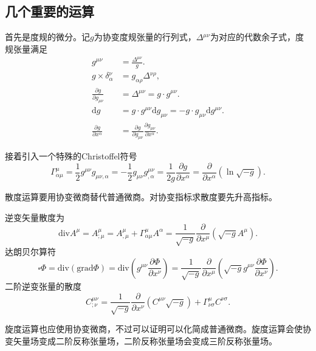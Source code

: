 \documentclass[11pt, a4paper, oneside, onecolumn]{ctexart}
\numberwithin{equation}{subsection}
\begin{document}
\subsection{几个重要的运算}
首先是度规的微分。记$g$为协变度规张量的行列式，$\Delta{}^{\mu\nu}$为对应的代数余子式，度规张量满足
\begin{align}
g^{\mu\nu}&=\frac{\Delta{}^{\mu\nu}}{g}.\\
g\times\delta{}_{\alpha}^{\nu}&=g_{\alpha\rho}\Delta{}^{\nu\rho},\\
\frac{\partial{}g}{\partial{}g_{\mu\nu}}&=\Delta{}^{\mu\nu}=g\cdot g^{\mu\nu}.\\
\mathrm{d}g&=g\cdot g^{\mu\nu}\mathrm{d}g_{\mu\nu}=-g\cdot g_{\mu\nu}\mathrm{d}g^{\mu\nu}.\\
\frac{\partial{}g}{\partial{}x^{\alpha}}&=\frac{\partial{}g}{\partial{}g_{\mu\nu}}\frac{\partial{}g_{\mu\nu}}{\partial{}x^{\alpha}}.
\end{align}

接着引入一个特殊的Christoffel符号
\begin{equation}
\Gamma_{\alpha\mu}^{\mu}=\frac12g^{\mu\nu}g_{\mu\nu,\alpha}=-\frac{1}{2}g_{\mu\nu}g^{\mu\nu}_{,\alpha}=\frac{1}{2g}\frac{\partial{}g}{\partial{}x^{\alpha}}=\frac{\partial{}}{\partial{}x^{\alpha}}\left(\ln\sqrt{-g}\right).\label{1.10.6}
\end{equation}

散度运算要用协变微商替代普通微商。对协变指标求散度要先升高指标。

逆变矢量散度为
\begin{equation}
\text{div}A^{\mu}=A^{\mu}_{;\mu}=A^{\mu}_{,\mu}+\Gamma^{\mu}_{\alpha\mu}A^{\alpha}=\frac{1}{\sqrt{-g}}\frac{\partial{}}{\partial{}x^{\mu}}\left(\sqrt{-g}A^{\mu}\right).
\end{equation}
达朗贝尔算符
\begin{equation}
\square\Phi=\text{div}\left(\text{grad}\Phi\right)=\text{div}\left(g^{\mu\nu}\frac{\partial{}\Phi}{\partial{}x^{\nu}}\right)=\frac{1}{\sqrt{-g}}\frac{\partial{}}{\partial{}x^{\mu}}\left(\sqrt{-g}g^{\mu\nu}\frac{\partial{}\Phi}{\partial{}x^{\nu}}\right).
\end{equation}
二阶逆变张量的散度
\begin{equation}
C^{\mu\nu}_{;\nu}=\frac{1}{\sqrt{-g}}\frac{\partial{}}{\partial{}x^{\nu}}\left(C^{\mu\nu}\sqrt{-g}\right)+\Gamma_{\nu\sigma}^{\mu}C^{\nu\sigma}.
\end{equation}

旋度运算也应使用协变微商，不过可以证明可以化简成普通微商。旋度运算会使协变矢量场变成二阶反称张量场，二阶反称张量场会变成三阶反称张量场。
\end{document}
